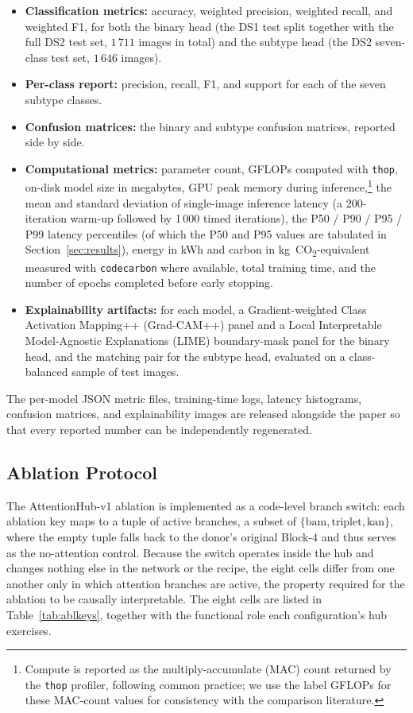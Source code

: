\begin{itemize}
  \item \textbf{Classification metrics:} accuracy, weighted precision,
  weighted recall, and weighted F1, for both the binary head (the DS1 test
  split together with the full DS2 test set, $1\,711$ images in total) and the
  subtype head (the DS2 seven-class test set, $1\,646$ images).
  \item \textbf{Per-class report:} precision, recall, F1, and support for
  each of the seven subtype classes.
  \item \textbf{Confusion matrices:} the binary and subtype confusion
  matrices, reported side by side.
  \item \textbf{Computational metrics:} parameter count, GFLOPs computed
  with \texttt{thop}, on-disk model size in megabytes, GPU peak memory
  during inference,\footnote{Compute is reported as the multiply-accumulate
  (MAC) count returned by the \texttt{thop} profiler, following common
  practice; we use the label GFLOPs for these MAC-count values for
  consistency with the comparison literature.} the mean and standard
  deviation of single-image
  inference latency (a 200-iteration warm-up followed by 1\,000 timed
  iterations), the P50 / P90 / P95 / P99 latency percentiles (of which
  the P50 and P95 values are tabulated in Section~\ref{sec:results}),
  energy in kWh and carbon in kg~CO\textsubscript{2}-equivalent measured
  with \texttt{codecarbon} where available, total training time, and the
  number of epochs completed before early stopping.
  \item \textbf{Explainability artifacts:} for each model, a
  Gradient-weighted Class Activation Mapping++ (Grad-CAM++) panel and a Local
  Interpretable Model-Agnostic Explanations (LIME) boundary-mask panel for
  the binary head, and the matching pair for the subtype head, evaluated on
  a class-balanced sample of test images.
\end{itemize}

The per-model JSON metric files, training-time logs, latency histograms,
confusion matrices, and explainability images are released alongside the
paper so that every reported number can be independently regenerated.

\subsection{Ablation Protocol}\label{ssec:ablation_protocol}

The AttentionHub-v1 ablation is implemented as a code-level branch switch:
each ablation key maps to a tuple of active branches, a subset of
$\{\text{bam},\text{triplet},\text{kan}\}$, where the empty tuple falls
back to the donor's original Block-4 and thus serves as the no-attention
control. Because the switch operates inside the hub and changes nothing
else in the network or the recipe, the eight cells differ from one another
only in which attention branches are active, the property required for
the ablation to be causally interpretable. The eight cells are listed in
Table~\ref{tab:ablkeys}, together with the functional role each
configuration's hub exercises.

